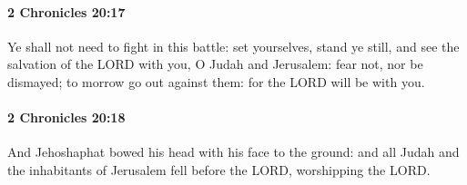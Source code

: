 		\paragraph{2 Chronicles 20:17} %
			\label{2CHRONICLES-20-17}

			Ye shall not need to fight in this battle: set yourselves, stand ye still, and see the salvation of the LORD with you, O Judah and Jerusalem: fear not, nor be dismayed; to morrow go out against them: for the LORD will be with you.


		\paragraph{2 Chronicles 20:18} %
			\label{2CHRONICLES-20-18}

			And Jehoshaphat bowed his head with his face to the ground: and all Judah and the inhabitants of Jerusalem fell before the LORD, worshipping the LORD.

